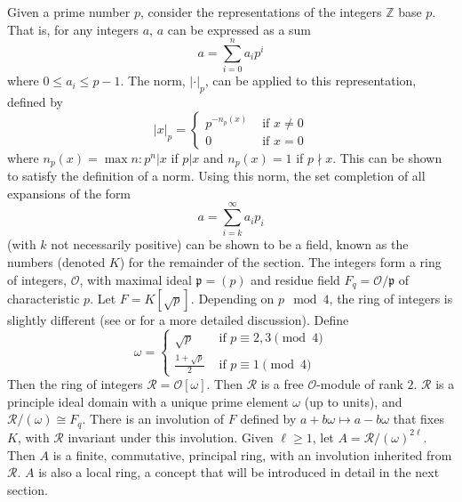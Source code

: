 Given a prime number $p$, consider the representations of the integers $\mathbb{Z}$ base $p$.
That is, for any integers $a$, $a$ can be expressed as a sum
\[
a = \sum_{i=0}^n a_i p^i
\]
where $0 \le a_i \le p - 1$.
The \padic norm, $|\cdot|_p$, can be applied to this representation, defined by
\[
|x|_p = \begin{cases}
p^{-n_p(x)} &\text{ if } x \ne 0\\
0 &\text{ if } x = 0
\end{cases}
\]
where $n_p(x) = \max{n: p^n | x}$ if $p | x$ and $n_p(x) = 1$ if $p \nmid x$.
This can be shown to satisfy the definition of a norm.
Using this norm, the set completion of all expansions of the form
\[
a = \sum_{i=k}^\infty a_i p_i
\]
(with $k$ not necessarily positive) can be shown to be a field, known as the \padic numbers (denoted $K$) for the remainder of the section.
The integers form a ring of integers, $\mathcal{O}$, 
with maximal ideal $\mathfrak{p} = (p)$ and residue field $F_q = \mathcal{O}/\mathfrak{p}$ of characteristic $p$.
Let $F = K[\sqrt{p}]$.
Depending on $p \mod 4$, the ring of integers is slightly different (see \cite{milneANT} or \cite{samuel} for a more detailed discussion).
Define
\[
\omega = \begin{cases}
\sqrt{p} &\text{ if } p \equiv 2,3 \pmod{4}\\
\frac{1 + \sqrt{p}}{2} &\text{ if } p \equiv 1 \pmod{4}
\end{cases}
\]
Then the ring of integers $\mathcal{R} = \mathcal{O}[\omega]$.
Then $\mathcal{R}$ is a free $\mathcal{O}$-module of rank $2$.
$\mathcal{R}$ is a principle ideal domain with a unique prime element $\omega$ (up to units), and $\mathcal{R}/(\omega) \cong F_q$.
There is an involution of $F$ defined by $a + b \omega \mapsto a - b \omega$ that fixes $K$, with $\mathcal{R}$ invariant under this involution.
Given $\ell \ge 1$, let $A = \mathcal{R} / (\omega)^{2\ell}$.
Then $A$ is a finite, commutative, principal ring, with an involution inherited from $\mathcal{R}$.
$A$ is also a local ring, a concept that will be introduced in detail in the next section.
